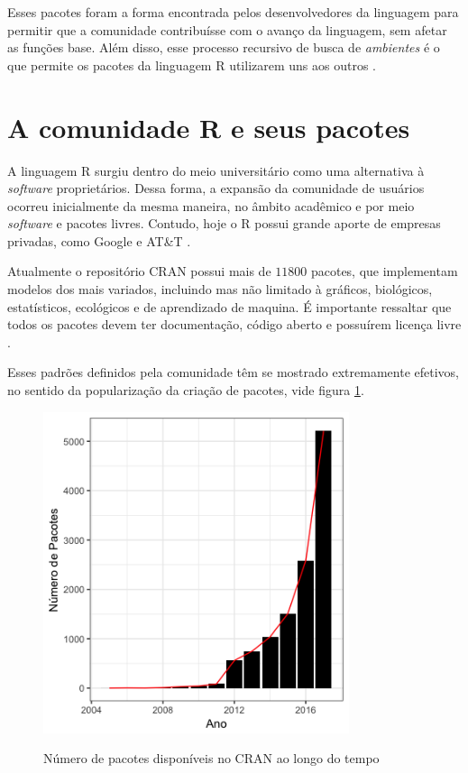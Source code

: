  Esses pacotes foram a forma encontrada pelos desenvolvedores da linguagem para permitir que a comunidade contribuísse com o avanço da linguagem, sem afetar as funções base. Além disso, esse processo recursivo de busca de \textit{ambientes} é o que permite os pacotes da linguagem R utilizarem uns aos outros \cite{TheRF2014}.

\section{A comunidade R e seus pacotes}
A linguagem R surgiu dentro do meio universitário como uma alternativa à \textit{software} proprietários. Dessa forma, a expansão da comunidade de usuários ocorreu inicialmente da mesma maneira, no âmbito acadêmico e por meio \textit{software} e pacotes livres. Contudo, hoje o R possui grande aporte de empresas privadas, como Google e AT\&T \cite{TheRF2014}. 

Atualmente o repositório CRAN possui mais de $11800$ pacotes, que implementam modelos dos mais variados, incluindo mas não limitado à gráficos, biológicos, estatísticos, ecológicos e de aprendizado de maquina. É importante ressaltar que todos os pacotes devem ter documentação, código aberto e possuírem licença livre \cite{TheRF2014}.  

Esses padrões definidos pela comunidade têm se mostrado extremamente efetivos, no sentido da popularização da criação de pacotes, vide figura \ref{fig:RNPackages}.

\begin{figure}[!htb]
	\centering
	\caption{Número de pacotes disponíveis no CRAN ao longo do tempo} 
	\includegraphics[width=0.8\textwidth]{./04-figuras/NRPackages}
	\label{fig:RNPackages}
\end{figure}


